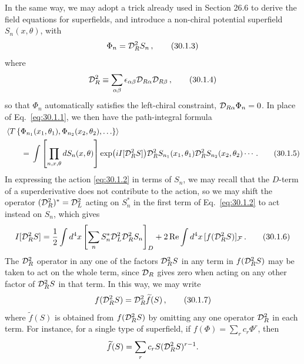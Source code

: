 In the same way, we may adopt a trick already used in Section 26.6 to derive
the field equations for superfields, and introduce a non-chiral potential
superfield \(S_n(x,\theta)\), with
\begin{equation}
  \Phi_n=\mathcal{D}_R^2S_n\,,
  \tag{30.1.3}\label{eq:30.1.3}
\end{equation}
where
\begin{equation}
  \mathcal{D}_R^2
  \equiv\sum_{\alpha\beta}
    \epsilon_{\alpha\beta}
    \mathcal{D}_{R\alpha}\mathcal{D}_{R\beta}\,,
  \tag{30.1.4}\label{eq:30.1.4}
\end{equation}
so that \(\Phi_n\) automatically satisfies the left-chiral constraint,
\(\mathcal{D}_{R\alpha}\Phi_n=0\). In place of Eq.~\eqref{eq:30.1.1}, we then
have the path-integral formula
\begin{align}
  &\left\langle
    T\left\{\Phi_{n_1}(x_1,\theta_1),
      \Phi_{n_2}(x_2,\theta_2),\ldots\right\}
   \right\rangle \notag\\
  &\qquad={}
  \int\left[\prod_{n,x,\theta}dS_n(x,\theta)\right]
    \exp\bigl(iI[\mathcal{D}_R^2S]\bigr)
    \mathcal{D}_R^2S_{n_1}(x_1,\theta_1)
    \mathcal{D}_R^2S_{n_2}(x_2,\theta_2)\cdots\,.
  \tag{30.1.5}\label{eq:30.1.5}
\end{align}
In expressing the action \eqref{eq:30.1.2} in terms of \(S_n\), we may recall
that the \(D\)-term of a superderivative does not contribute to the action, so
we may shift the operator
\((\mathcal{D}_R^2)^*=\mathcal{D}_L^2\) acting on \(S_n^*\) in the first term of
Eq.~\eqref{eq:30.1.2} to act instead on \(S_n\), which gives
\begin{equation}
  I[\mathcal{D}_R^2S]
  =\frac12\int d^4x
    \left[\sum_n S_n^*\mathcal{D}_L^2\mathcal{D}_R^2S_n\right]_D
   +2\operatorname{Re}\int d^4x\,
    [f(\mathcal{D}_R^2S)]_{\mathcal{F}}\,.
  \tag{30.1.6}\label{eq:30.1.6}
\end{equation}
The \(\mathcal{D}_R^2\) operator in any one of the factors \(\mathcal{D}_R^2S\) in
any term in \(f(\mathcal{D}_R^2S)\) may be taken to act on the whole term, since
\(\mathcal{D}_R\) gives zero when acting on any other factor of
\(\mathcal{D}_R^2S\) in that term. In this way, we may write
\begin{equation}
  f(\mathcal{D}_R^2S)=\mathcal{D}_R^2\widetilde f(S)\,,
  \tag{30.1.7}\label{eq:30.1.7}
\end{equation}
where \(\widetilde f(S)\) is obtained from \(f(\mathcal{D}_R^2S)\) by omitting
any one operator \(\mathcal{D}_R^2\) in each term. For instance, for a single
type of superfield, if \(f(\Phi)=\sum_r c_r\Phi^r\), then
\[
  \widetilde f(S)=\sum_r c_rS(\mathcal{D}_R^2S)^{r-1}.
\]

